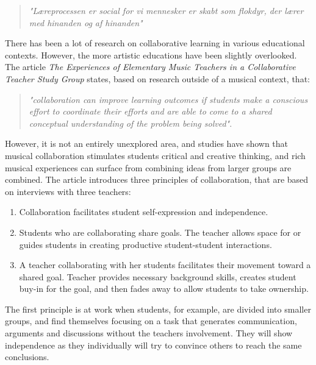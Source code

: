	\begin{quote}
		\textit{"Læreprocessen er social for vi mennesker er skabt som flokdyr, der lærer med hinanden og af hinanden"}\cite[p.~17]{laeringIPraksis} \\
	\end{quote}
	
	There has been a lot of research on collaborative learning in various educational contexts. However, the more artistic educations have been slightly overlooked\cite{collaborativeLearningTeachers}\cite{collaborativeMusicAnalysis}\cite{collaborativeLearningReview}. 
	The article \textit{The Experiences of Elementary Music Teachers in a Collaborative Teacher Study Group} states, based on research outside of a musical context, that:\\
	\begin{quote}
		\textit{"collaboration can improve learning outcomes if students make a conscious effort to coordinate their efforts and are able to come to a shared conceptual understanding of the problem being solved"}\cite{collaborativeLearningTeachers}.\\
	\end{quote}

	However, it is not an entirely unexplored area, and studies have shown that musical collaboration stimulates students critical and creative thinking, and rich musical experiences can surface from combining ideas from larger groups are combined\cite{collaborativeLearningTeachers}. 
	The article introduces three principles of collaboration, that are based on interviews with three teachers:\\
	\begin{enumerate}
		\item Collaboration facilitates student self-expression and independence.
		\item Students who are collaborating share goals. The teacher allows space for or guides students in creating productive student-student interactions.
		\item A teacher collaborating with her students facilitates their movement toward a shared goal. Teacher provides necessary background skills, creates student buy-in for the goal, and then fades away to allow students to take ownership.\\
	\end{enumerate}

	The first principle is at work when students, for example, are divided into smaller groups, and find themselves focusing on a task that generates communication, arguments and discussions without the teachers involvement. They will show independence as they individually will try to convince others to reach the same conclusions.\\
	
